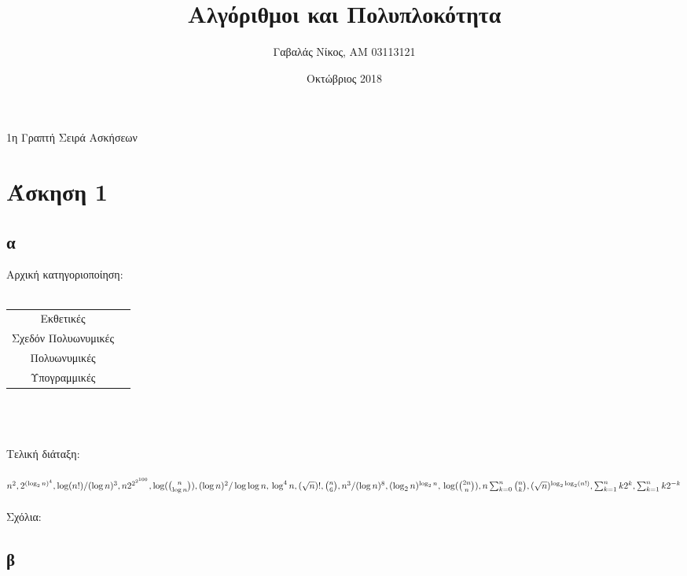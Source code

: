 \documentclass[12pt,a4paper]{article}
\title{Αλγόριθμοι και Πολυπλοκότητα}
\author{Γαβαλάς Νίκος, AM 03113121}
\date{Οκτώβριος 2018}
\begin{document}
  \maketitle

  \begin{center}
    \Large{1η Γραπτή Σειρά Ασκήσεων}
  \end{center}

  \section{Άσκηση 1}

  \subsection{α}
    Αρχική κατηγοριοποίηση: \\
    \\
    \begin{tabular}{ c c }
      \hline
      Εκθετικές &  \\
      Σχεδόν Πολυωνυμικές &  \\
      Πολυωνυμικές &  \\
      Υπογραμμικές &  \\
      \hline
    \end{tabular}\\
    \\
    \\
    Τελική διάταξη:\\
    \\
    \( n^2, 2^{(\log_{2}{n})^4}, \log(n!)/(\log{n})^3, \\
    n2^{2^{2^{100}}}, \log(\binom{n}{\log{n}}), (\log{n})^2/\log\log{n},\\
    \log^{4}n, (\sqrt{n})!, \binom{n}{6}, n^3/(\log{n})^8, (\log_{2}{n})^{\log_{2}{n}},\\
    \log(\binom{2n}{n}), n\sum_{k=0}^{n}\binom{n}{k}, (\sqrt{n})^{\log_{2}\log_{2}(n!)}, \sum_{k=1}^{n}k2^k,
    \sum_{k=1}^{n} k2^{-k} \)\\
    \\
    Σχόλια:

  \subsection{β}
\end{document}
